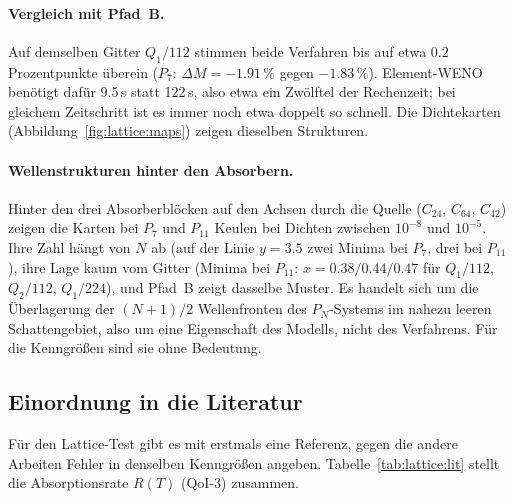 \paragraph{Vergleich mit Pfad~B.} Auf demselben Gitter $Q_1/112$ stimmen beide Verfahren bis auf
etwa $0.2$ Prozentpunkte überein ($P_7$: $\Delta M=-1.91\,\%$ gegen $-1.83\,\%$). Element-WENO
benötigt dafür 9.5\,s statt 122\,s, also etwa ein Zwölftel der Rechenzeit; bei gleichem
Zeitschritt ist es immer noch etwa doppelt so schnell. Die Dichtekarten
(Abbildung~\ref{fig:lattice:maps}) zeigen dieselben Strukturen.

\paragraph{Wellenstrukturen hinter den Absorbern.} Hinter den drei Absorberblöcken auf den Achsen
durch die Quelle ($C_{24}$, $C_{64}$, $C_{42}$) zeigen die Karten bei $P_7$ und $P_{11}$
Keulen bei Dichten zwischen $10^{-8}$ und $10^{-5}$. Ihre Zahl hängt von $N$ ab (auf der Linie
$y=3.5$ zwei Minima bei $P_7$, drei bei $P_{11}$), ihre Lage kaum vom Gitter (Minima bei $P_{11}$:
$x=0.38/0.44/0.47$ für $Q_1/112$, $Q_2/112$, $Q_1/224$), und Pfad~B zeigt dasselbe Muster. Es
handelt sich um die Überlagerung der $(N+1)/2$ Wellenfronten des $P_N$-Systems im nahezu leeren
Schattengebiet, also um eine Eigenschaft des Modells, nicht des Verfahrens. Für die Kenngrößen sind
sie ohne Bedeutung.

\subsection{Einordnung in die Literatur}

Für den Lattice-Test gibt es mit \cite{schotthoefer_hauck_2025} erstmals eine Referenz, gegen die
andere Arbeiten Fehler in denselben Kenngrößen angeben. Tabelle~\ref{tab:lattice:lit} stellt die
Absorptionsrate $R(T)$ (QoI-3) zusammen.

